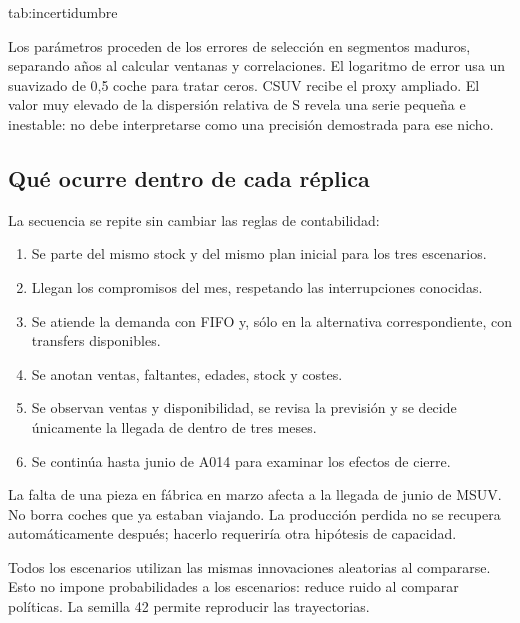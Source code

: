 {tab:incertidumbre}{}

Los parámetros proceden de los errores de selección en segmentos maduros,
separando años al calcular ventanas y correlaciones. El logaritmo de error usa
un suavizado de 0,5 coche para tratar ceros. CSUV recibe el proxy ampliado. El
valor muy elevado de la dispersión relativa de S revela una serie pequeña e
inestable: no debe interpretarse como una precisión demostrada para ese nicho.

\subsection{Qué ocurre dentro de cada réplica}
La secuencia se repite sin cambiar las reglas de contabilidad:
\begin{enumerate}
  \item Se parte del mismo stock y del mismo plan inicial para los tres escenarios.
  \item Llegan los compromisos del mes, respetando las interrupciones conocidas.
  \item Se atiende la demanda con FIFO y, sólo en la alternativa correspondiente,
  con transfers disponibles.
  \item Se anotan ventas, faltantes, edades, stock y costes.
  \item Se observan ventas y disponibilidad, se revisa la previsión y se decide
  únicamente la llegada de dentro de tres meses.
  \item Se continúa hasta junio de A014 para examinar los efectos de cierre.
\end{enumerate}

La falta de una pieza en fábrica en marzo afecta a la llegada de junio de MSUV.
No borra coches que ya estaban viajando. La producción perdida no se recupera
automáticamente después; hacerlo requeriría otra hipótesis de capacidad.

Todos los escenarios utilizan las mismas innovaciones aleatorias al compararse.
Esto no impone probabilidades a los escenarios: reduce ruido al comparar políticas.
La semilla 42 permite reproducir las trayectorias.

